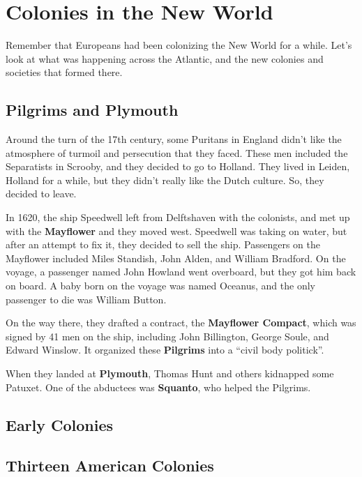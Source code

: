 \chapter{Colonies in the New World}

Remember that Europeans had been colonizing the New World for a while.
Let's look at what was happening across the Atlantic,
and the new colonies and societies that formed there.

\section{Pilgrims and Plymouth}

Around the turn of the 17th century,
some Puritans in England didn't like the atmosphere of turmoil and persecution that they faced.
These men included the Separatists in Scrooby, and they decided to go to Holland.
They lived in Leiden, Holland for a while, but they didn't really like the Dutch culture.
So, they decided to leave.

In 1620, the ship Speedwell left from Delftshaven with the colonists,
and met up with the \textbf{Mayflower} and they moved west.
Speedwell was taking on water, but after an attempt to fix it, they decided to sell the ship.
Passengers on the Mayflower included Miles Standish, John Alden, and William Bradford.
On the voyage, a passenger named John Howland went overboard, but they got him back on board.
A baby born on the voyage was named Oceanus, and the only passenger to die was William Button.

On the way there, they drafted a contract, the \textbf{Mayflower Compact},
which was signed by 41 men on the ship, including John Billington, George Soule, and Edward Winslow.
It organized these \textbf{Pilgrims} into a ``civil body politick''.

When they landed at \textbf{Plymouth}, Thomas Hunt and others kidnapped some Patuxet.
One of the abductees was \textbf{Squanto}, who helped the Pilgrims.

\section{Early Colonies}

\section{Thirteen American Colonies}

